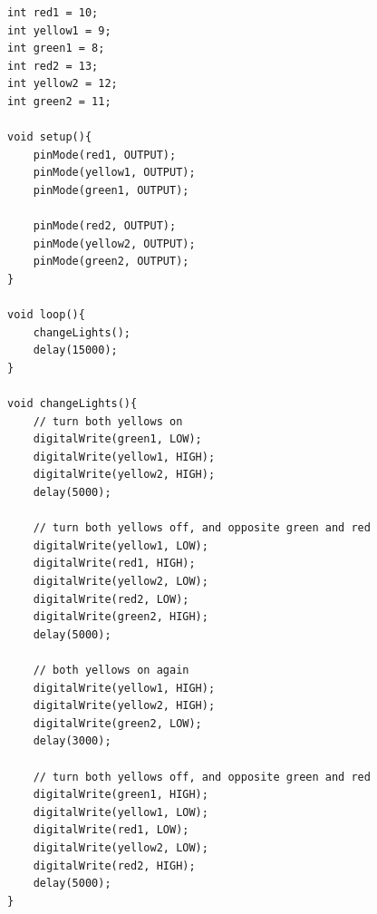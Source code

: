 \documentclass[a4paper, 11pt]{article}           %
\begin{document}
\begin{lstlisting}
int red1 = 10;
int yellow1 = 9;
int green1 = 8;
int red2 = 13;
int yellow2 = 12;
int green2 = 11;

void setup(){
    pinMode(red1, OUTPUT);
    pinMode(yellow1, OUTPUT);
    pinMode(green1, OUTPUT);

    pinMode(red2, OUTPUT);
    pinMode(yellow2, OUTPUT);
    pinMode(green2, OUTPUT);
}

void loop(){
    changeLights();
    delay(15000);
}

void changeLights(){
    // turn both yellows on
    digitalWrite(green1, LOW);
    digitalWrite(yellow1, HIGH);
    digitalWrite(yellow2, HIGH);
    delay(5000);

    // turn both yellows off, and opposite green and red
    digitalWrite(yellow1, LOW);
    digitalWrite(red1, HIGH);
    digitalWrite(yellow2, LOW);
    digitalWrite(red2, LOW);
    digitalWrite(green2, HIGH);
    delay(5000);

    // both yellows on again
    digitalWrite(yellow1, HIGH);
    digitalWrite(yellow2, HIGH);
    digitalWrite(green2, LOW);
    delay(3000);

    // turn both yellows off, and opposite green and red
    digitalWrite(green1, HIGH);
    digitalWrite(yellow1, LOW);
    digitalWrite(red1, LOW);
    digitalWrite(yellow2, LOW);
    digitalWrite(red2, HIGH);
    delay(5000);
}
\end{lstlisting}


\end{document}
